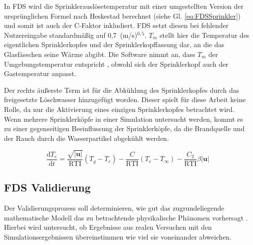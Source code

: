 In FDS wird die Sprinklerauslösetemperatur mit einer umgestellten Version der ursprünglichen Formel nach Heskestad \cite{Heskestad1988} berechnet (siehe Gl. \ref{eq:FDSSprinkler}) und somit ist auch der C-Faktor inkludiert. FDS setzt diesen bei fehlender Nutzereingabe standardmäßig auf 0,7~(m/s)$^{0,5}$. $T_m$ stellt hier die Temperatur des eigentlichen Sprinklerkopfes und der Sprinklerkopffassung dar, an die das Glasfässchen seine Wärme abgibt. Die Software nimmt an, dass $T_m$ der Umgebungstemperatur entspricht \cite{FDSTech}, obwohl sich der Sprinklerkopf auch der Gas\-temperatur anpasst.

Der rechts äußerste Term ist für die Abkühlung des Sprinklerkopfes durch das freigesetzte Löschwasser hinzugefügt worden. Dieser spielt für diese Arbeit keine Rolle, da nur die Aktivierung eines einzigen Sprinklerkopfes betrachtet wird. Wenn mehrere Sprinklerköpfe in einer Simulation untersucht werden, kommt es zu einer gegenseitigen Beeinflussung der Sprinklerköpfe, da die Brandquelle und der Rauch durch die Wasserpartikel abgekühlt werden. 


\begin{equation}
\label{eq:FDSSprinkler}
\frac{\mathrm{d} T_{e}}{\mathrm{d} t}=\frac{\sqrt{|\mathbf{u}|}}{\mathrm{RTI}}\left(T_{g}-T_{e}\right)-\frac{C}{\mathrm{RTI}}\left(T_{e}-T_{\infty}\right)-\frac{C_{2}}{\mathrm{RTI}} \beta|\mathbf{u}|
\end{equation}




\subsection{FDS Validierung}
\label{sec:FDSVal}

Der Validierungsprozess soll determinieren, wie gut das zugrundeliegende mathematische Modell das zu betrachtende physikalische Phänomen vorhersagt \cite{FDSVal}. Hierbei wird untersucht, ob Ergebnisse aus realen Versuchen mit den Simulationsergebnissen übereinstimmen \bzw wie viel sie voneinander abweichen. 

